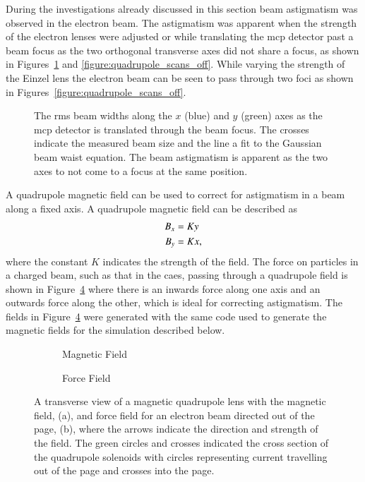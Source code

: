 During the investigations already discussed in this section beam astigmatism was observed in the electron beam.
The astigmatism was apparent when the strength of the electron lenses were adjusted or while translating the \gls{mcp} detector past a beam focus as the two orthogonal transverse axes did not share a focus, as shown in Figures~\ref{figure:astigmatism_translation} and \ref{figure:quadrupole_scans_off}.
While varying the strength of the Einzel lens the electron beam can be seen to pass through two foci as shown in Figures~\ref{figure:quadrupole_scans_off}.

\begin{figure}
    \centering
    
    \caption[Electron beam astigmatism.]{The \gls{rms} beam widths along the $x$ (blue) and $y$ (green) axes as the \gls{mcp} detector is translated through the beam focus.
    The crosses indicate the measured beam size and the line a fit to the Gaussian beam waist equation.
    The beam astigmatism is apparent as the two axes to not come to a focus at the same position.}
    \label{figure:astigmatism_translation}
\end{figure}

A quadrupole magnetic field can be used to correct for astigmatism in a beam along a fixed axis.
A quadrupole magnetic field can be described as
\begin{align}
B_x &= K y \notag\\
B_y &= K x,
\end{align}
where the constant $K$ indicates the strength of the field.
The force on particles in a charged beam, such as that in the \gls{caes}, passing through a quadrupole field is shown in Figure~\ref{figure:quadrupole_example} where there is an inwards force along one axis and an outwards force along the other, which is ideal for correcting astigmatism.
The fields in Figure~\ref{figure:quadrupole_example} were generated with the same code used to generate the magnetic fields for the simulation described below.

\begin{figure}
    \centering
    \begin{subfigure}{0.49\linewidth}
    \centering
    
    \caption{Magnetic Field}
    \label{figure:quadrupole_example_field}
    \end{subfigure}
    \begin{subfigure}{0.49\linewidth}
    \centering
    
    \caption{Force Field}
    \label{figure:quadrupole_example_force}
    \end{subfigure}
    \caption[Quadrupole magnetic and force fields.]{A transverse view of a magnetic quadrupole lens with the magnetic field, (a), and force field for an electron beam directed out of the page, (b), where the arrows indicate the direction and strength of the field.
    The green circles and crosses indicated the cross section of the quadrupole solenoids with circles representing current travelling out of the page and crosses into the page.}
    \label{figure:quadrupole_example}
\end{figure}

